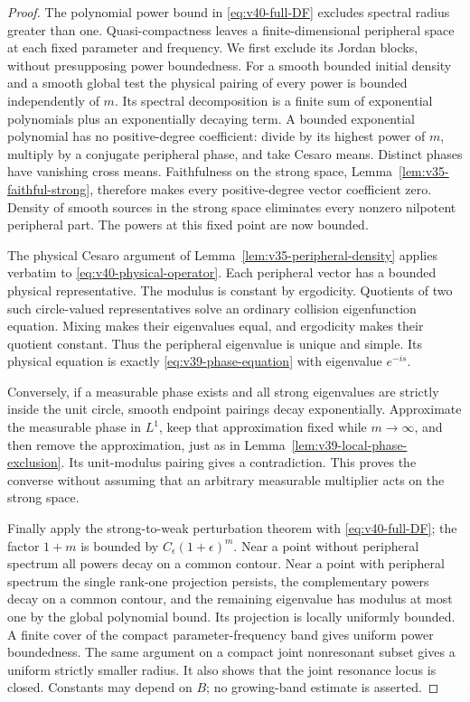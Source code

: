 \begin{proof}
The polynomial power bound in \eqref{eq:v40-full-DF} excludes spectral
radius greater than one. Quasi-compactness leaves a finite-dimensional
peripheral space at each fixed parameter and frequency. We first
exclude its Jordan blocks, without presupposing power boundedness.
For a smooth bounded initial density and a smooth global test the
physical pairing of every power is bounded independently of $m$.
Its spectral decomposition is a finite sum of exponential polynomials
plus an exponentially decaying term. A bounded exponential polynomial
has no positive-degree coefficient: divide by its highest power of
$m$, multiply by a conjugate peripheral phase, and take Cesaro means.
Distinct phases have vanishing cross means. Faithfulness on the strong
space, Lemma~\ref{lem:v35-faithful-strong}, therefore makes every
positive-degree vector coefficient zero. Density of smooth sources
in the strong space eliminates every nonzero nilpotent peripheral
part. The powers at this fixed point are now bounded.

The physical Cesaro argument of
Lemma~\ref{lem:v35-peripheral-density} applies verbatim to
\eqref{eq:v40-physical-operator}. Each peripheral vector has a bounded
physical representative. The modulus is constant by ergodicity.
Quotients of two such circle-valued representatives solve an ordinary
collision eigenfunction equation. Mixing makes their eigenvalues
equal, and ergodicity makes their quotient constant. Thus the
peripheral eigenvalue is unique and simple. Its physical equation is
exactly \eqref{eq:v39-phase-equation} with eigenvalue $e^{-is}$.

Conversely, if a measurable phase exists and all strong eigenvalues
are strictly inside the unit circle, smooth endpoint pairings decay
exponentially. Approximate the measurable phase in $L^1$, keep that
approximation fixed while $m\to\infty$, and then remove the
approximation, just as in Lemma~\ref{lem:v39-local-phase-exclusion}.
Its unit-modulus pairing gives a contradiction. This proves the
converse without assuming that an arbitrary measurable multiplier
acts on the strong space.

Finally apply the strong-to-weak perturbation theorem with
\eqref{eq:v40-full-DF}; the factor $1+m$ is bounded by $C_\epsilon
(1+\epsilon)^m$. Near a point without peripheral spectrum all powers
decay on a common contour. Near a point with peripheral spectrum the
single rank-one projection persists, the complementary powers decay
on a common contour, and the remaining eigenvalue has modulus at
most one by the global polynomial bound. Its projection is locally
uniformly bounded. A finite cover of the compact parameter-frequency
band gives uniform power boundedness. The same argument on a compact
joint nonresonant subset gives a uniform strictly smaller radius.
It also shows that the joint resonance locus is closed. Constants
may depend on $B$; no growing-band estimate is asserted.
\end{proof}
